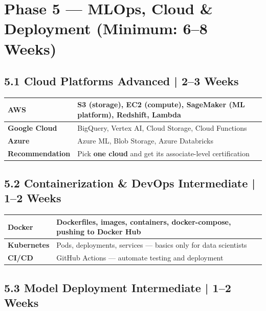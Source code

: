 \documentclass[a4paper,11pt]{article}
\begin{document}
\section{Phase 5 — MLOps, Cloud \& Deployment \hfill \small\normalfont\color{teal}(Minimum: 6--8 Weeks)}

\subsection{5.1 Cloud Platforms \hfill \small\normalfont\color{darkgray}Advanced | 2--3 Weeks}

\begin{tabular}{>{\bfseries}p{3.5cm} p{11cm}}
\toprule
\textbf{AWS} & S3 (storage), EC2 (compute), SageMaker (ML platform), Redshift, Lambda \\
\midrule
\textbf{Google Cloud} & BigQuery, Vertex AI, Cloud Storage, Cloud Functions \\
\midrule
\textbf{Azure} & Azure ML, Blob Storage, Azure Databricks \\
\midrule
Recommendation & Pick \textbf{one cloud} and get its associate-level certification \\
\bottomrule
\end{tabular}

\subsection{5.2 Containerization \& DevOps \hfill \small\normalfont\color{darkgray}Intermediate | 1--2 Weeks}

\begin{tabular}{>{\bfseries}p{3cm} p{11.5cm}}
\toprule
Docker & Dockerfiles, images, containers, docker-compose, pushing to Docker Hub \\
\midrule
Kubernetes & Pods, deployments, services — basics only for data scientists \\
\midrule
CI/CD & GitHub Actions — automate testing and deployment \\
\bottomrule
\end{tabular}

\subsection{5.3 Model Deployment \hfill \small\normalfont\color{darkgray}Intermediate | 1--2 Weeks}
\end{document}

